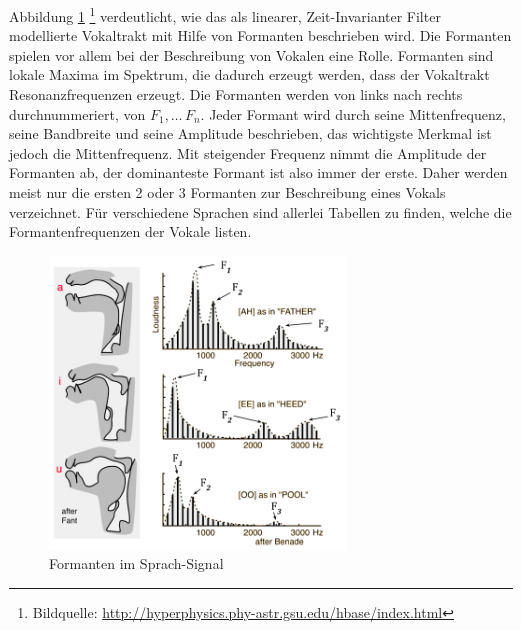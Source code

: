 Abbildung \ref{img:formants} \footnote{Bildquelle: \url{http://hyperphysics.phy-astr.gsu.edu/hbase/index.html}} verdeutlicht, wie das als linearer, Zeit-Invarianter Filter modellierte Vokaltrakt mit Hilfe von Formanten beschrieben wird. Die Formanten spielen vor allem bei der Beschreibung von Vokalen eine Rolle. Formanten sind lokale Maxima im Spektrum, die dadurch erzeugt werden, dass der Vokaltrakt Resonanzfrequenzen erzeugt. Die Formanten werden von links nach rechts durchnummeriert, von $F_1 ,\ldots\,F_n$. Jeder Formant wird durch seine Mittenfrequenz, seine Bandbreite und seine Amplitude beschrieben, das wichtigste Merkmal ist jedoch die Mittenfrequenz. Mit steigender Frequenz nimmt die Amplitude der Formanten ab, der dominanteste Formant ist also immer der erste. Daher werden meist nur die ersten 2 oder 3 Formanten zur Beschreibung eines Vokals verzeichnet. Für verschiedene Sprachen sind allerlei Tabellen zu finden, welche die Formantenfrequenzen der Vokale listen.\cite[S. 19]{sprachverarbeitung}

\begin{figure}[h]
	\centering
	\includegraphics[width=0.7\textwidth]{bilder/formants02.png}
	\caption{Formanten im Sprach-Signal}
	\label{img:formants}
\end{figure}	

